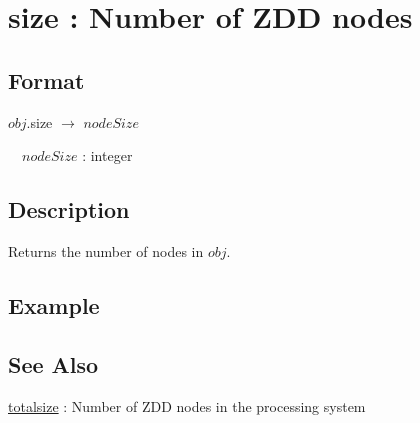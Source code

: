 
\section{size : Number of ZDD nodes\label{sect:size}}
\subsection*{Format}
$obj$.size $\rightarrow$ $nodeSize$

~~$nodeSize$ : integer

\subsection*{Description}
Returns the number of nodes in $obj$.

\subsection*{Example}


\subsection*{See Also}
\hyperref[sect:totalsize]{totalsize} : Number of ZDD nodes in the processing system


